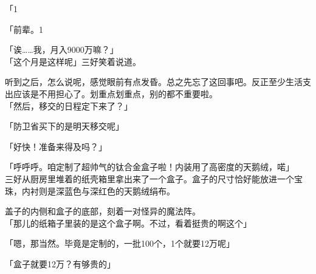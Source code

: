 「1%

「前辈。1%

「诶……我，月入9000万嘛？」\\

「这个月是这样呢」三好笑着说道。

听到之后，怎么说呢，感觉眼前有点发昏。总之先忘了这回事吧。反正至少生活支出应该是不用担心了。划重点划重点，别的都不重要啦。\\

「然后，移交的日程定下来了？」

「防卫省买下的是明天移交呢」

「好快！准备来得及吗？」

「呼呼呼。咱定制了超帅气的钛合金盒子啦！内装用了高密度的天鹅绒，喏」\\

三好从厨房里堆着的纸壳箱里拿出来了一个盒子。盒子的尺寸恰好能放进一个宝珠，内衬则是深蓝色与深红色的天鹅绒绢布。

盖子的内侧和盒子的底部，刻着一对怪异的魔法阵。\\

「那儿的纸箱子里装的是这个盒子啊。不过，看着挺贵的啊这个」

「嗯，那当然。毕竟是定制的，一批100个，1个就要12万呢」

「盒子就要12万？有够贵的」

